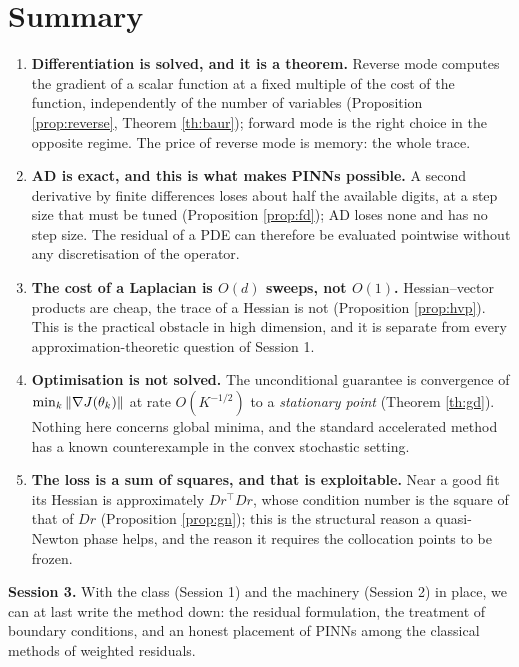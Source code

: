 \documentclass[11pt,a4paper]{article}
\begin{document}
\section{Summary}

\begin{keybox}
\begin{enumerate}[label=\textbf{\arabic*.}, leftmargin=*]
\item \textbf{Differentiation is solved, and it is a theorem.} Reverse mode computes the gradient of
a scalar function at a fixed multiple of the cost of the function, independently of the number of
variables (Proposition \ref{prop:reverse}, Theorem \ref{th:baur}); forward mode is the right choice
in the opposite regime. The price of reverse mode is memory: the whole trace.
\item \textbf{AD is exact, and this is what makes PINNs possible.} A second derivative by finite
differences loses about half the available digits, at a step size that must be tuned
(Proposition \ref{prop:fd}); AD loses none and has no step size. The residual of a PDE can therefore
be evaluated pointwise without any discretisation of the operator.
\item \textbf{The cost of a Laplacian is $O(d)$ sweeps, not $O(1)$.} Hessian--vector products are
cheap, the trace of a Hessian is not (Proposition \ref{prop:hvp}). This is the practical obstacle in
high dimension, and it is separate from every approximation-theoretic question of Session 1.
\item \textbf{Optimisation is not solved.} The unconditional guarantee is convergence of
$\min_k\left\lVert \nabla J(\theta_k) \right\rVert$ at rate $O(K^{-1/2})$ to a \emph{stationary point}
(Theorem \ref{th:gd}). Nothing here concerns global minima, and the standard accelerated method has
a known counterexample in the convex stochastic setting.
\item \textbf{The loss is a sum of squares, and that is exploitable.} Near a good fit its Hessian is
approximately $Dr^{\!\top}Dr$, whose condition number is the square of that of $Dr$
(Proposition \ref{prop:gn}); this is the structural reason a quasi-Newton phase helps, and the
reason it requires the collocation points to be frozen.
\end{enumerate}
\end{keybox}

\medskip
\noindent
\textbf{Session 3.} With the class (Session 1) and the machinery (Session 2) in place, we can at
last write the method down: the residual formulation, the treatment of boundary conditions, and an
honest placement of PINNs among the classical methods of weighted residuals.
\end{document}
